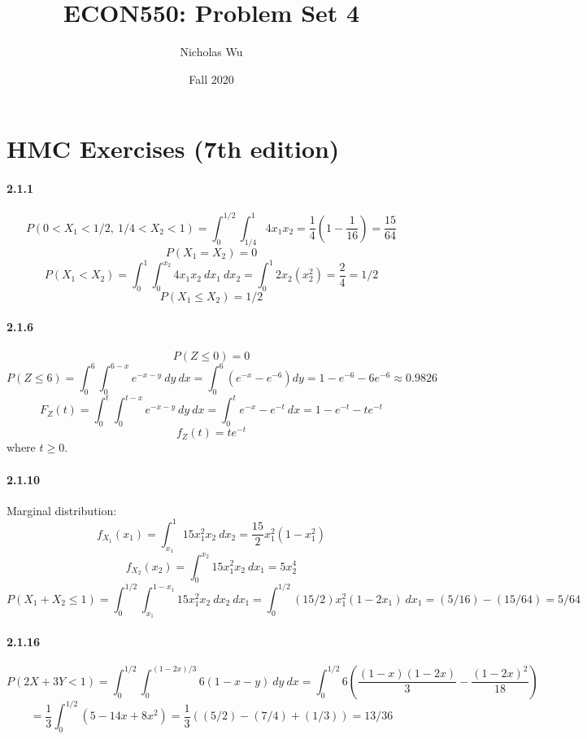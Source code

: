 \documentclass[10pt,letter]{article}
\begin{document}


\title{ECON550: Problem Set 4}

\author{Nicholas Wu}

\date{Fall 2020}

\maketitle
\section*{HMC Exercises (7th edition)}
\paragraph{2.1.1}
\[ P(0 < X_1 < 1/2, \ 1/4 < X_2 < 1) = \int_0^{1/2} \int_{1/4}^1 4x_1x_2 = \frac{1}{4} \left( 1 - \frac{1}{16}\right) = \frac{15}{64}  \]
\[ P(X_1 = X_2) = 0 \]
\[ P(X_1 < X_2) = \int_0^1 \int_{0}^{x_2} 4x_1 x_2 \ dx_1 \ dx_2 = \int_0^1 2x_2 ( x_2^2) = \frac{2}{4} = 1/2 \]
\[ P(X_1 \le X_2) = 1/2 \]
\paragraph{2.1.6}
\[ P(Z \le 0) = 0 \]
\[ P(Z \le 6) = \int_0^6 \int_0^{6 - x} e^{-x-y} \ dy \ dx = \int_0^6 \left(e^{-x} - e^{-6} \right) dy =  1 - e^{-6} - 6e^{-6} \approx 0.9826  \]
\[ F_Z(t) = \int_0^t \int_0^{t-x} e^{-x-y} \ dy \ dx = \int_0^t e^{-x} - e^{-t} \ dx = 1 - e^{-t} - te^{-t} \]
\[ f_Z(t) = te^{-t} \]
where $t \ge 0$.
\paragraph{2.1.10}
Marginal distribution:
\[ f_{X_1}(x_1) = \int_{x_1}^1 15x_1^2 x_2 \ dx_2 = \frac{15}{2} x_1^2 (1 - x_1^2) \]
\[ f_{X_2}(x_2) = \int_{0}^{x_2} 15x_1^2 x_2 \ dx_1 = 5x_2^4 \]
\[ P(X_1 + X_2 \le 1) = \int_{0}^{1/2} \int_{x_1}^{1-x_1} 15x_1^2 x_2 \ dx_2 \ dx_1 = \int_{0}^{1/2} (15/2)x_1^2 (1-2x_1) \ dx_1 = (5/16) - (15/64) = 5/64 \]
\paragraph{2.1.16}
\[ P(2X + 3Y < 1) = \int_0^{1/2} \int_{0}^{(1-2x)/3} 6(1-x-y) \ dy \ dx = \int_0^{1/2} 6\left(\frac{(1-x)(1-2x)}{3} - \frac{(1-2x)^2}{18} \right) \]
\[ = \frac{1}{3} \int_0^{1/2} (5-14x + 8x^2) = \frac{1}{3}( (5/2) - (7/4) + (1/3)) = 13/36  \]
\end{document}
